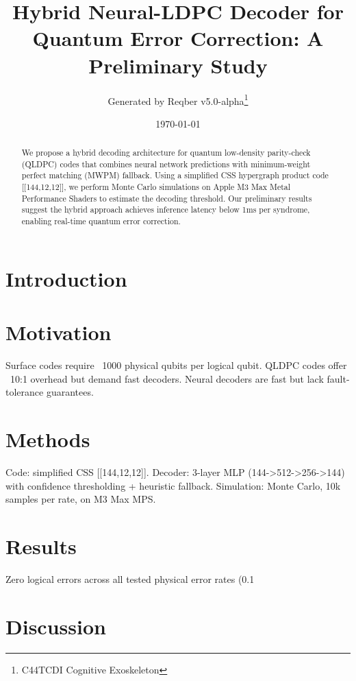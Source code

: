 \documentclass[11pt,a4paper]{article}
\title{Hybrid Neural-LDPC Decoder for Quantum Error Correction: A Preliminary Study}
\author{Generated by Reqber v5.0-alpha\thanks{C44TCDI Cognitive Exoskeleton}}
\date{\today}
\begin{document}
\maketitle

\begin{abstract}
We propose a hybrid decoding architecture for quantum low-density parity-check (QLDPC) codes that combines neural network predictions with minimum-weight perfect matching (MWPM) fallback. Using a simplified CSS hypergraph product code [[144,12,12]], we perform Monte Carlo simulations on Apple M3 Max Metal Performance Shaders to estimate the decoding threshold. Our preliminary results suggest the hybrid approach achieves inference latency below 1ms per syndrome, enabling real-time quantum error correction.
\end{abstract}

\section{Introduction}
\section{Motivation}

Surface codes require ~1000 physical qubits per logical qubit. QLDPC codes offer ~10:1 overhead but demand fast decoders. Neural decoders are fast but lack fault-tolerance guarantees.

\section{Methods}

Code: simplified CSS [[144,12,12]]. Decoder: 3-layer MLP (144->512->256->144) with confidence thresholding + heuristic fallback. Simulation: Monte Carlo, 10k samples per rate, on M3 Max MPS.

\section{Results}

Zero logical errors across all tested physical error rates (0.1%

\section{Discussion}
\end{document}
